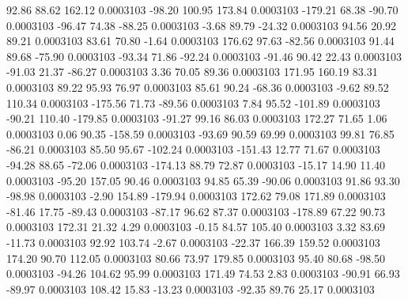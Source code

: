        92.86       88.62      162.12     0.0003103
      -98.20      100.95      173.84     0.0003103
     -179.21       68.38      -90.70     0.0003103
      -96.47       74.38      -88.25     0.0003103
       -3.68       89.79      -24.32     0.0003103
       94.56       20.92       89.21     0.0003103
       83.61       70.80       -1.64     0.0003103
      176.62       97.63      -82.56     0.0003103
       91.44       89.68      -75.90     0.0003103
      -93.34       71.86      -92.24     0.0003103
      -91.46       90.42       22.43     0.0003103
      -91.03       21.37      -86.27     0.0003103
        3.36       70.05       89.36     0.0003103
      171.95      160.19       83.31     0.0003103
       89.22       95.93       76.97     0.0003103
       85.61       90.24      -68.36     0.0003103
       -9.62       89.52      110.34     0.0003103
     -175.56       71.73      -89.56     0.0003103
        7.84       95.52     -101.89     0.0003103
      -90.21      110.40     -179.85     0.0003103
      -91.27       99.16       86.03     0.0003103
      172.27       71.65        1.06     0.0003103
        0.06       90.35     -158.59     0.0003103
      -93.69       90.59       69.99     0.0003103
       99.81       76.85      -86.21     0.0003103
       85.50       95.67     -102.24     0.0003103
     -151.43       12.77       71.67     0.0003103
      -94.28       88.65      -72.06     0.0003103
     -174.13       88.79       72.87     0.0003103
      -15.17       14.90       11.40     0.0003103
      -95.20      157.05       90.46     0.0003103
       94.85       65.39      -90.06     0.0003103
       91.86       93.30      -98.98     0.0003103
       -2.90      154.89     -179.94     0.0003103
      172.62       79.08      171.89     0.0003103
      -81.46       17.75      -89.43     0.0003103
      -87.17       96.62       87.37     0.0003103
     -178.89       67.22       90.73     0.0003103
      172.31       21.32        4.29     0.0003103
       -0.15       84.57      105.40     0.0003103
        3.32       83.69      -11.73     0.0003103
       92.92      103.74       -2.67     0.0003103
      -22.37      166.39      159.52     0.0003103
      174.20       90.70      112.05     0.0003103
       80.66       73.97      179.85     0.0003103
       95.40       80.68      -98.50     0.0003103
      -94.26      104.62       95.99     0.0003103
      171.49       74.53        2.83     0.0003103
      -90.91       66.93      -89.97     0.0003103
      108.42       15.83      -13.23     0.0003103
      -92.35       89.76       25.17     0.0003103
